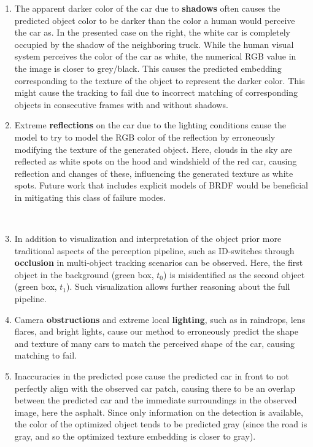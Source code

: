 \begin{enumerate}[label=(\alph*)]
    \item The apparent darker color of the car due to \textbf{shadows} often causes the predicted object color to be darker than the color a human would perceive the car as. In the presented case on the right, the white car is completely occupied by the shadow of the neighboring truck. While the human visual system perceives the color of the car as white, the numerical RGB value in the image is closer to grey/black. This causes the predicted embedding corresponding to the texture of the object to represent the darker color. This might cause the tracking to fail due to incorrect matching of corresponding objects in consecutive frames with and without shadows. \\
    
    \item Extreme \textbf{reflections} on the car due to the lighting conditions cause the model to try to model the RGB color of the reflection by erroneously modifying the texture of the generated object. Here, clouds in the sky are reflected as white spots on the hood and windshield of the red car, causing reflection and changes of these, influencing the generated texture as white spots. Future work that includes explicit models of BRDF would be beneficial in mitigating this class of failure modes. \\
\end{enumerate} \\

\begin{enumerate}[label=(\alph*)]\setcounter{enumi}{2}
    \item In addition to visualization and interpretation of the object prior more traditional aspects of the perception pipeline, such as ID-switches through \textbf{occlusion} in multi-object tracking scenarios can be observed. Here, the first object in the background (green box, $t_0$) is misidentified as the second object (green box, $t_1$). Such visualization allows further reasoning about the full pipeline. \\
    
    \item Camera \textbf{obstructions} and extreme local \textbf{lighting}, such as in raindrops, lens flares, and bright lights, cause our method to erroneously predict the shape and texture of many cars to match the perceived shape of the car, causing matching to fail. \\
    
    \item Inaccuracies in the predicted pose cause the predicted car in front to not perfectly align with the observed car patch, causing there to be an overlap between the predicted car and the immediate surroundings in the observed image, here the asphalt. Since only information on the detection is available, the color of the optimized object tends to be predicted gray (since the road is gray, and so the optimized texture embedding is closer to gray).
\end{enumerate}

